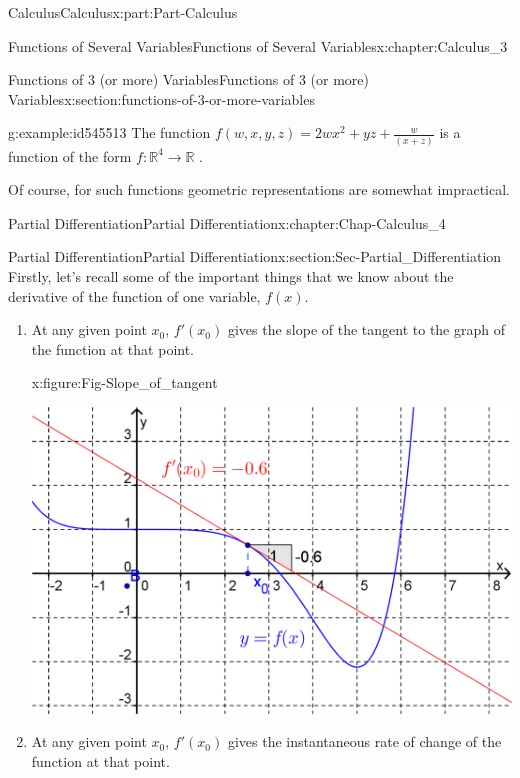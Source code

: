 \documentclass[oneside,10pt,]{book}
\numberwithin{equation}{section}
\begin{document}
\begin{partptx}{Calculus}{}{Calculus}{}{}{x:part:Part-Calculus}
\begin{chapterptx}{Functions of Several Variables}{}{Functions of Several Variables}{}{}{x:chapter:Calculus_3}
\begin{sectionptx}{Functions of 3 (or more) Variables}{}{Functions of 3 (or more) Variables}{}{}{x:section:functions-of-3-or-more-variables}
\begin{example}{}{g:example:id545513}
The function \(f(w,x,y,z)=2wx^2+yz+\frac{w}{(x+z)}\) is a function of the form \(f:\mathbb{R}^4\rightarrow\mathbb{R}\) .%
\end{example}
Of course, for such functions geometric representations are somewhat impractical.%
\end{sectionptx}
\end{chapterptx}
%
\typeout{************************************************}
\typeout{************************************************}
%
\begin{chapterptx}{Partial Differentiation}{}{Partial Differentiation}{}{}{x:chapter:Chap-Calculus_4}
%
%
\typeout{************************************************}
\typeout{************************************************}
%
\begin{sectionptx}{Partial Differentiation}{}{Partial Differentiation}{}{}{x:section:Sec-Partial_Differentiation}
Firstly, let’s recall some of the important things that we know about the derivative of the function of one variable, \(f(x)\).%
\par
%
\begin{enumerate}[label=\roman*]
\item{}At any given point \(x_0\), \(f'(x_0)\) gives the slope of the tangent to the graph of the function at that point. \begin{figureptx}{}{x:figure:Fig-Slope_of_tangent}{}%
\begin{image}{0.075}{0.85}{0.075}%
\includegraphics[width=\linewidth]{./Calculus/Images/4/Slope_of_tangent.png}
\end{image}%
\tcblower
\end{figureptx}%
%
\item{}At any given point \(x_0\), \(f'(x_0)\) gives the instantaneous rate of change of the function at that point.%

\end{enumerate}
\end{sectionptx}
\end{chapterptx}
\end{partptx}
\end{document}

